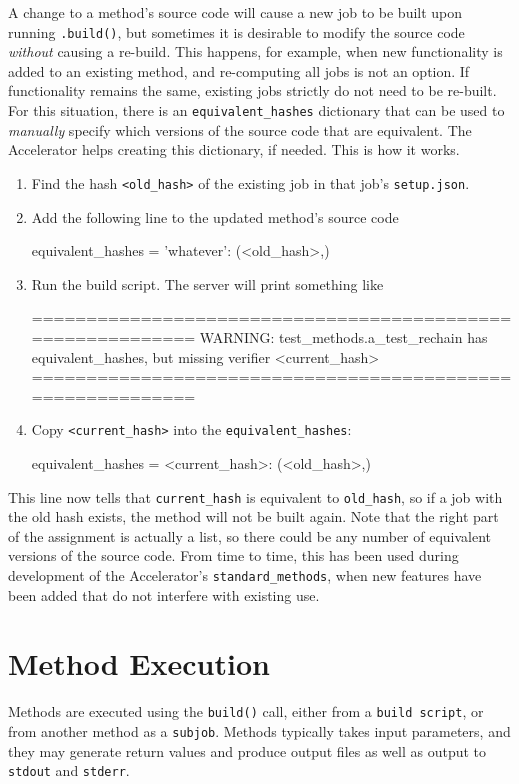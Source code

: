A change to a method's source code will cause a new job to be built
upon running \texttt{.build()}, but sometimes it is
desirable to modify the source code \textsl{without} causing a
re-build.  This happens, for example, when new functionality is added
to an existing method, and re-computing all jobs is not an option.  If
functionality remains the same, existing jobs strictly do not need to
be re-built.  For this situation, there is an
\texttt{equivalent\_hashes} dictionary that can be used to \textsl{manually} specify
which versions of the source code that are equivalent.  The
Accelerator helps creating this dictionary, if needed.  This is how it
works.
\begin{enumerate}
\item Find the hash \texttt{<old\_hash>} of the existing job in that
  job's \texttt{setup.json}.
\item Add the following line to the updated method's source code
\begin{python}
equivalent_hashes = {'whatever': (<old_hash>,)}
\end{python}
\item Run the build script.  The server will print something like
\begin{shell}
===========================================================
WARNING: test_methods.a_test_rechain has equivalent_hashes,
but missing verifier <current_hash>
===========================================================
\end{shell}
\item Copy \texttt{<current\_hash>} into the
  \texttt{equivalent\_hashes}:
\begin{python}
equivalent_hashes = {<current_hash>: (<old_hash>,)}
\end{python}
\end{enumerate}
This line now tells that \texttt{current\_hash} is equivalent to
\texttt{old\_hash}, so if a job with the old hash exists, the method
will not be built again.  Note that the right part of the assignment
is actually a list, so there could be any number of equivalent
versions of the source code.  From time to time, this has been used
during development of the Accelerator's \texttt{standard\_methods},
when new features have been added that do not interfere with existing
use.



\section{Method Execution}
Methods are executed using the \texttt{build()} call, either from a
\texttt{build script}, or from another method as a \texttt{subjob}.
Methods typically takes input parameters, and they may generate return
values and produce output files as well as output to \texttt{stdout}
and \texttt{stderr}.


